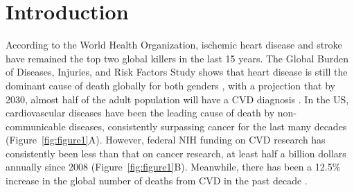 \documentclass[letter]{bib}
\begin{document}
\maketitle
\section*{Introduction}
	
According to the World Health Organization, ischemic heart disease and stroke have remained the top two global killers in the last 15 years. The Global Burden of Diseases, Injuries, and Risk Factors Study shows that heart disease is still the dominant cause of death globally for both genders \citep{Roth:2018:Global}, with a projection that by 2030, almost half of the adult population will have a CVD diagnosis \citep{Leopold:2018:Emerging,Heidenreich:2011:Forecasting}. In the US, cardiovascular diseases have been the leading cause of death by non-communicable diseases, consistently surpassing cancer for the last many decades (Figure~\ref{fig:figure1}A). However, federal NIH funding on CVD research has consistently been less than that on cancer research, at least half a billion dollars annually since 2008 (Figure~\ref{fig:figure1}B). Meanwhile, there has been a 12.5\% increase in the global number of deaths from CVD in the past decade \citep{Joseph:2017:Reducing}.  
\end{document}
